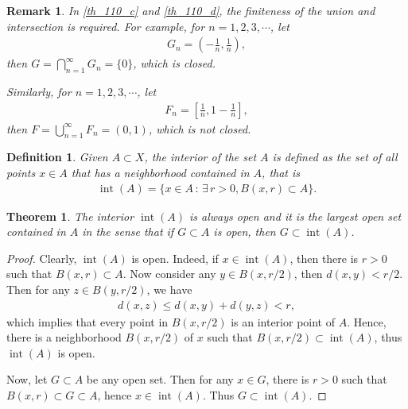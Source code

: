 \documentclass[10pt]{book}
\newtheorem{definition}{Definition}[chapter]
\newtheorem{theorem}{Theorem}[chapter]
\newtheorem{remark}{Remark}[chapter]
\theoremstyle{definition}
\numberwithin{equation}{chapter}
\begin{document}
\begin{remark}
In \ref{th_110_c} and \ref{th_110_d}, the finiteness of the union and intersection is required. For example, for $n = 1,2,3,\cdots$, let 
\begin{align*}
    G_n = \left(- \frac{1}{n}, \frac{1}{n}\right), 
\end{align*}
then $G = \bigcap^\infty_{n=1} G_n = \{0\}$, which is closed.  

Similarly, for $n = 1,2,3,\cdots$, let  
\begin{align*}
    F_n = \left[\frac{1}{n}, 1 - \frac{1}{n}\right],
\end{align*}
then $F = \bigcup^\infty_{n=1} F_n = (0,1)$, which is not closed.
\end{remark}

\medskip

\begin{definition}
Given $A \subset X$, the interior of the set $A$ is defined as the set of all points $x \in A$ that has a neighborhood contained in $A$, that is
\begin{align*}
    \operatorname{int}(A) = \{x \in A \,:\, \exists \, r > 0, B(x,r) \subset A\}.
\end{align*}
\end{definition}

\medskip

\begin{theorem}
The interior $\operatorname{int}(A)$ is always open and it is the largest open set contained in $A$ in the sense that if $G \subset A$ is open, then $G \subset \operatorname{int}(A)$.
\end{theorem}
\begin{proof}
Clearly, $\operatorname{int}(A)$ is open. Indeed, if $x \in \operatorname{int}(A)$, then there is $r > 0$ such that $B(x,r) \subset A$. Now consider any $y \in B(x,r/2)$, then $d(x,y) < r/2$. Then for any $z \in B(y, r/2)$, we have
\begin{align*}
    d(x,z) \leq d(x,y) + d(y,z) < r,
\end{align*}
which implies that every point in $B(x,r/2)$ is an interior point of $A$. Hence, there is a neighborhood $B(x,r/2)$ of $x$ such that $B(x,r/2) \subset \operatorname{int}(A)$, thus $\operatorname{int}(A)$ is open.

Now, let $G \subset A$ be any open set. Then for any $x \in G$, there is $r > 0$ such that $B(x,r) \subset G \subset A$, hence $x \in \operatorname{int}(A)$. Thus $G \subset \operatorname{int}(A)$.
\end{proof}
\end{document}
